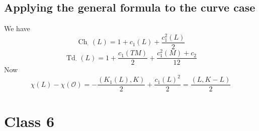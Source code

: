 \subsection{Applying the general formula to the curve case}

We have
\[\operatorname{Ch}_{\cdot}(L)=1+c_1(L)+\frac{c_1^2(L)}{2}\]
\[\operatorname{Td}_{\cdot}(L)=1+\frac{c_1(TM)}{2}+\frac{c_1^2(M)+c_2}{12}\]
Now
\[\chi(L)-\chi(\mathcal{O})=-\frac{(K_1(L),K)}{2}+\frac{c_1(L)^2}{2}=\frac{(L,K-L)}{2}\]





\section{Class 6}





